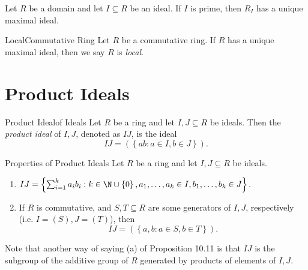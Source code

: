 \documentclass[pmath347]{subfiles}
\begin{document}
    \begin{prop}{}
        Let $R$ be a domain and let $I\subseteq R$ be an ideal. If $I$ is prime, then $R_I$ has a unique maximal ideal.
    \end{prop}

    \begin{definition}{Local}{Commutative Ring}
        Let $R$ be a commutative ring. If $R$ has a unique maximal ideal, then we say $R$ is \emph{local}.
    \end{definition}
    
    \section{Product Ideals}

    \begin{definition}{Product Ideal}{of Ideals}
        Let $R$ be a ring and let $I,J\subseteq R$ be ideals. Then the \emph{product ideal} of $I,J$, denoted as $IJ$, is the ideal
        \begin{equation*}
            IJ = \left( \left\lbrace ab:a\in I, b\in J \right\rbrace  \right) .
        \end{equation*}
    \end{definition}

    \begin{prop}{Properties of Product Ideals}
        Let $R$ be a ring and let $I,J\subseteq R$ be ideals.
        \begin{enumerate}
            \item $IJ = \left\lbrace \sum^{k}_{i=1} a_ib_i: k\in\N\cup\left\lbrace 0 \right\rbrace , a_1,\ldots,a_k\in I, b_1,\ldots,b_k\in J \right\rbrace$.
            \item If $R$ is commutative, and $S,T\subseteq R$ are some generators of $I,J$, respectively (i.e. $I=\left( S \right) , J=\left( T \right)$), then
                \begin{equation*}
                    IJ = \left( \left\lbrace a,b:a\in S, b\in T \right\rbrace  \right) .
                \end{equation*}
        \end{enumerate}
    \end{prop}

    \np Note that another way of saying (a) of Proposition 10.11 is that $IJ$ is the subgroup of the additive group of $R$ generated by products of elements of $I,J$.
    
\end{document}
